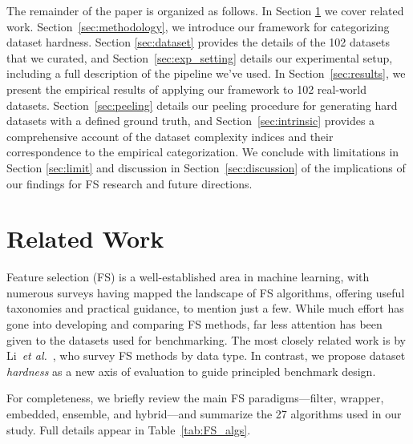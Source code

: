 \documentclass[preprint,12pt,authoryear]{elsarticle}
\begin{document}
\vspace{3mm}

The remainder of the paper is organized as follows. In Section \ref{sec:related} we cover related work.  Section~\ref{sec:methodology}, we introduce our framework for categorizing dataset hardness. Section \ref{sec:dataset} provides the details of the 102 datasets that we curated,  and Section~\ref{sec:exp_setting} details our experimental setup, including a full description of the pipeline we've used. In Section~\ref{sec:results}, we present the empirical results of applying our framework to 102 real-world datasets. Section~\ref{sec:peeling} details our peeling procedure for generating hard datasets with a defined ground truth, and Section~\ref{sec:intrinsic} provides a comprehensive account of the dataset complexity indices and their correspondence to the empirical categorization. We conclude with limitations in Section \ref{sec:limit} and discussion in  Section~\ref{sec:discussion} of the implications of our findings for FS research and future directions.





\section{Related Work}\label{sec:related}
Feature selection (FS) is a well-established area in machine learning, with numerous surveys having mapped the landscape of FS algorithms, offering useful taxonomies and practical guidance, \cite{bolon2015recent,li2017feature,theng2024feature,nouri2023novel} to mention just a few. While much effort has gone into developing and comparing FS methods, far less attention has been given to the datasets used for benchmarking. The most closely related work is by Li~\emph{et al.}~\cite{li2017feature}, who survey FS methods by data type. In contrast, we propose dataset \emph{hardness} as a new axis of evaluation to guide principled benchmark design.

For completeness, we briefly review the main FS paradigms—filter, wrapper, embedded, ensemble, and hybrid—and summarize the 27 algorithms used in our study. Full details appear in Table~\ref{tab:FS_algs}. 
\end{document}

